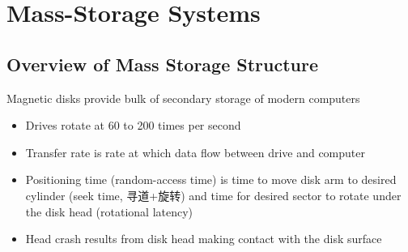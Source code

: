 \newpage
\section{Mass-Storage Systems}

\subsection{Overview of Mass Storage Structure}
Magnetic disks provide bulk of secondary storage of modern computers
\begin{itemize}
    \item Drives rotate at 60 to 200 times per second
    \item Transfer rate is rate at which data flow between drive and computer
    \item Positioning time (random-access time) is time to move disk arm to
    desired cylinder (seek time, 寻道+旋转) and time for desired sector to rotate under
    the disk head (rotational latency)
    \item Head crash results from disk head making contact with the disk
    surface
\end{itemize}

